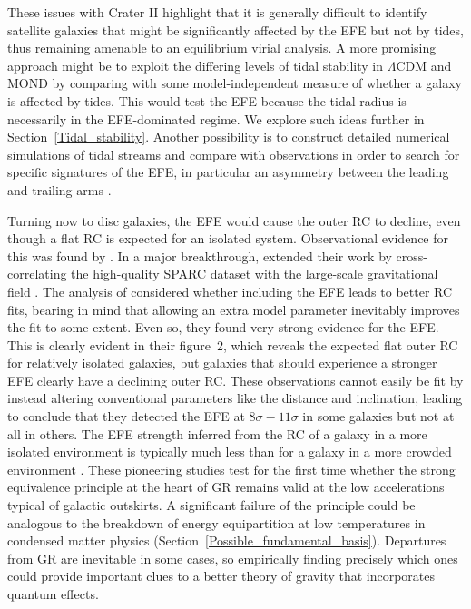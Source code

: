 \documentclass[fleqn,usenatbib,useAMS,onecolumn]{mnras} %
\begin{document}
These issues with Crater II highlight that it is generally difficult to identify satellite galaxies that might be significantly affected by the EFE but not by tides, thus remaining amenable to an equilibrium virial analysis. A more promising approach might be to exploit the differing levels of tidal stability in $\Lambda$CDM and MOND by comparing with some model-independent measure of whether a galaxy is affected by tides. This would test the EFE because the tidal radius is necessarily in the EFE-dominated regime. We explore such ideas further in Section~\ref{Tidal_stability}. Another possibility is to construct detailed numerical simulations of tidal streams and compare with observations in order to search for specific signatures of the EFE, in particular an asymmetry between the leading and trailing arms \citep[Section~\ref{Tidal_streams}; see also][]{Thomas_2018}.

Turning now to disc galaxies, the EFE would cause the outer RC to decline, even though a flat RC is expected for an isolated system. Observational evidence for this was found by \citet{Haghi_2016}. In a major breakthrough, \citet{Chae_2020_EFE} extended their work by cross-correlating the high-quality SPARC dataset with the large-scale gravitational field \citep{Desmond_2018}. The analysis of \citet{Chae_2020_EFE} considered whether including the EFE leads to better RC fits, bearing in mind that allowing an extra model parameter inevitably improves the fit to some extent. Even so, they found very strong evidence for the EFE. This is clearly evident in their figure~2, which reveals the expected flat outer RC for relatively isolated galaxies, but galaxies that should experience a stronger EFE clearly have a declining outer RC. These observations cannot easily be fit by instead altering conventional parameters like the distance and inclination, leading \citet{Chae_2020_EFE} to conclude that they detected the EFE at $8\sigma-11\sigma$ in some galaxies but not at all in others. The EFE strength inferred from the RC of a galaxy in a more isolated environment is typically much less than for a galaxy in a more crowded environment \citep{Chae_2021}. These pioneering studies test for the first time whether the strong equivalence principle at the heart of GR remains valid at the low accelerations typical of galactic outskirts. A significant failure of the principle could be analogous to the breakdown of energy equipartition at low temperatures in condensed matter physics (Section~\ref{Possible_fundamental_basis}). Departures from GR are inevitable in some cases, so empirically finding precisely which ones could provide important clues to a better theory of gravity that incorporates quantum effects.
\end{document}

